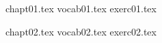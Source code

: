 \documentclass[12pt]{book}
\begin{document}
%
%
%

{chapt01.tex}
{vocab01.tex}
{exerc01.tex}

{chapt02.tex}
{vocab02.tex}
{exerc02.tex}





%
%
%
%
%
%
%
%
%
%
%
%
%
%
%
%
%
%
%
\end{document}
